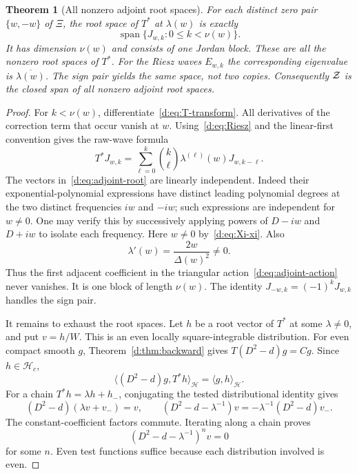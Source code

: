 \documentclass[11pt,a4paper]{article}
\numberwithin{equation}{section}
\newtheorem{theorem}{Theorem}[section]
\theoremstyle{definition}\newtheorem{definition}[theorem]{Definition}
\theoremstyle{remark}\newtheorem{remark}[theorem]{Remark}
\newcommand{\Hh}{\mathcal H}\newcommand{\Hw}{\mathcal H}
\newcommand{\ip}[2]{\langle#1,#2\rangle}\newcommand{\norm}[1]{\lVert#1\rVert}\newcommand{\abs}[1]{\lvert#1\rvert}
\begin{document}
\begin{theorem}[All nonzero adjoint root spaces]\label{d:thm:adjoint}
For each distinct zero pair $\{w,-w\}$ of $\Xi$, the root space of $T^*$ at $\lambda(w)$ is exactly
\begin{equation}\label{d:eq:adjoint-root}
 \operatorname{span}\{J_{w,k}:0\le k<\nu(w)\}.
\end{equation}
It has dimension $\nu(w)$ and consists of one Jordan block. These are all the nonzero root spaces of $T^*$. For the Riesz waves $E_{w,k}$ the corresponding eigenvalue is $\overline{\lambda(w)}$. The sign pair yields the same space, not two copies. Consequently $\mathcal Z$ is the closed span of all nonzero adjoint root spaces.
\end{theorem}
\begin{proof}
For $k<\nu(w)$, differentiate~\eqref{d:eq:T-transform}. All derivatives of the correction term that occur vanish at $w$. Using~\eqref{d:eq:Riesz} and the linear-first convention gives the raw-wave formula
\begin{equation}\label{d:eq:adjoint-action}
 T^*J_{w,k}=\sum_{\ell=0}^k\binom{k}{\ell}
 \lambda^{(\ell)}(w)J_{w,k-\ell}.
\end{equation}
The vectors in~\eqref{d:eq:adjoint-root} are linearly independent. Indeed their exponential-polynomial expressions have distinct leading polynomial degrees at the two distinct frequencies $iw$ and $-iw$; such expressions are independent for $w\ne0$. One may verify this by successively applying powers of $D-iw$ and $D+iw$ to isolate each frequency. Here $w\ne0$ by~\eqref{d:eq:Xi-xi}. Also
\[
 \lambda'(w)=\frac{2w}{\Delta(w)^2}\ne0.
\]
Thus the first adjacent coefficient in the triangular action~\eqref{d:eq:adjoint-action} never vanishes. It is one block of length $\nu(w)$. The identity $J_{-w,k}=(-1)^kJ_{w,k}$ handles the sign pair.

It remains to exhaust the root spaces. Let $h$ be a root vector of $T^*$ at some $\lambda\ne0$, and put $v=h/W$. This is an even locally square-integrable distribution. For even compact smooth $g$, Theorem~\ref{d:thm:backward} gives $T(D^2-d)g=Cg$. Since $h\in\Hh_c$,
\begin{equation}\label{d:eq:root-test}
 \ip{(D^2-d)g}{T^*h}_{\Hh}=\ip{g}{h}_{\Hh}.
\end{equation}
For a chain $T^*h=\lambda h+h_-$, conjugating the tested distributional identity gives
\[
 (D^2-d)(\lambda v+v_-)=v,
 \qquad (D^2-d-\lambda^{-1})v=-\lambda^{-1}(D^2-d)v_-.
\]
The constant-coefficient factors commute. Iterating along a chain proves
\begin{equation}\label{d:eq:root-ODE}
 (D^2-d-\lambda^{-1})^n v=0
\end{equation}
for some $n$. Even test functions suffice because each distribution involved is even.


\end{proof}
\end{document}
